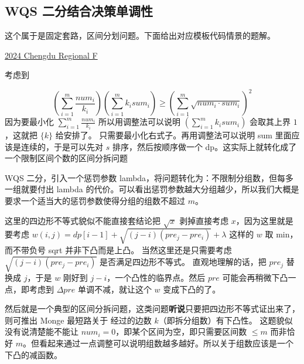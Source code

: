 \subsection{WQS 二分结合决策单调性}

这个属于是固定套路，区间分划问题。下面给出对应模板代码情景的题解。

\href{https://codeforces.com/gym/105486/problem/F}{2024 Chengdu Regional F} 

考虑到

$$
(\sum\limits_{i=1}^{m}\frac{num_i}{k_i}) (\sum\limits_{i=1}^{m}k_i sum_i) \ge (\sum_{i=1}^{m}\sqrt{num_i\cdot sum_i})^2
$$
因为要最小化 $\sum\limits_{i=1}^{m}\frac{num_i}{k_i}$ 所以用调整法可以说明 $(\sum\limits_{i=1}^{m}k_i sum_i)$ 会取其上界 $1$，这就把 $\{k\}$ 给安排了。
只需要最小化右式子。再用调整法可以说明 sum 里面应该是连续的，于是可以先对 $s$ 排序，然后按顺序做一个 dp。这实际上就转化成了一个限制区间个数的区间分拆问题

WQS 二分，引入一个惩罚参数 lambda，将问题转化为：不限制分组数，但每多一组就要付出 lambda 的代价。可以看出惩罚参数越大分组越少，所以我们大概是要求一个适当大的惩罚参数使得分组的组数不超过 $m$。

这里的四边形不等式貌似不能直接套结论把 $\sqrt{x}$ 剥掉直接考虑 $x$，因为这里就是要考虑 $w(i,j) = dp[i-1] + \sqrt{(j-i)(pre_{j} - pre_{i})} + \lambda$ 这样的 $w$ 取 min，而不带负号 sqrt 并非下凸而是上凸。
当然这里还是只需要考虑 $\sqrt{(j-i)(pre_{j} - pre_{i})}$ 是否满足四边形不等式。
直观地理解的话，把 $pre_j$ 替换成 $j$，于是 $w$ 刚好到 $j-i$，一个凸性的临界点。然后 $pre$ 可能会再稍微下凸一点，即考虑到 $\Delta pre$ 单调不减，就让这个 $w$ 变成下凸的了。

然后就是一个典型的区间分拆问题，这类问题\textbf{听说}只要把四边形不等式证出来了，则可推出 Monge 最短路关于 经过的边数 $k$（即拆分组数）有下凸性。
这题貌似没有说清楚能不能让 $num_i=0$，即某个区间为空，即只需要区间数 $\le m$ 而非恰好 $m$。但看起来通过一点调整可以说明组数越多越好。所以关于组数应该是一个下凸的减函数。

